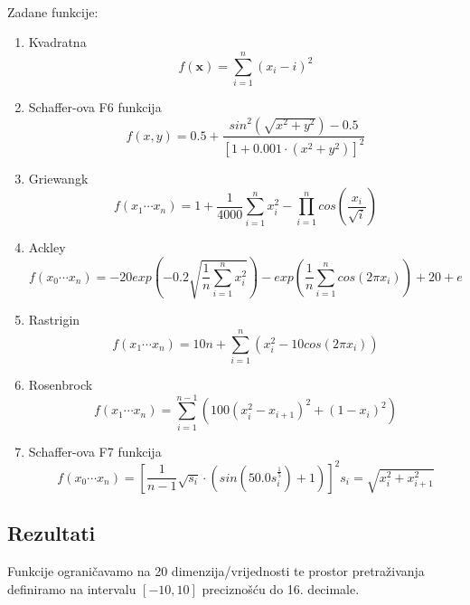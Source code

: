 \documentclass[times, utf8, zavrsni, numeric]{fer}
\begin{document}
\paragraph{}
Zadane funkcije:
\begin{enumerate}
\item Kvadratna
\begin{equation}
f(\mathbf {x} )=\sum _{{i=1}}^{n}(x_{i}-i)^{2}
\end{equation}
\item Schaffer-ova F6 funkcija
\begin{equation}
f(x,y)=0.5+\frac{sin^2(\sqrt{x^2 + y^2})-0.5}{[1+0.001 \cdot (x^2 + y^2)]^2}
\end{equation}
\item Griewangk
\begin{equation}
f(x_1 \cdots x_n) = 1 + \frac{1}{4000} \sum_{i=1}^n x^2_i - \prod_{i=1}^n cos(\frac{x_i}{\sqrt{i}})
\end{equation}
\item Ackley
\begin{equation}
f(x_0 \cdots x_n) = -20 exp(-0.2 \sqrt{\frac{1}{n} \sum_{i=1}^n x_i^2}) - exp(\frac{1}{n} \sum_{i=1}^n cos(2\pi x_i)) + 20 + e
\end{equation}
\item Rastrigin
\begin{equation}
f(x_1 \cdots x_n) = 10n + \sum_{i=1}^n (x_i^2 -10cos(2\pi x_i))
\end{equation}
\item Rosenbrock
\begin{equation}
f(x_1 \cdots x_n) = \sum_{i=1}^{n-1} (100(x_i^2 - x_{i+1})^2 + (1-x_i)^2)
\end{equation}
\item Schaffer-ova F7 funkcija
\begin{equation}
f(x_0 \cdots x_n) = [\frac{1}{n-1}\sqrt{s_i} \cdot (sin(50.0s_i^{\frac{1}{5}})+1)]^2 s_i = \sqrt{x_i^2 + x_{i+1}^2}
\end{equation}
\end{enumerate}

\subsection{Rezultati}
Funkcije ograničavamo na 20 dimenzija/vrijednosti te prostor pretraživanja definiramo na intervalu $[-10, 10]$ preciznošću do 16. decimale.
\end{document}
